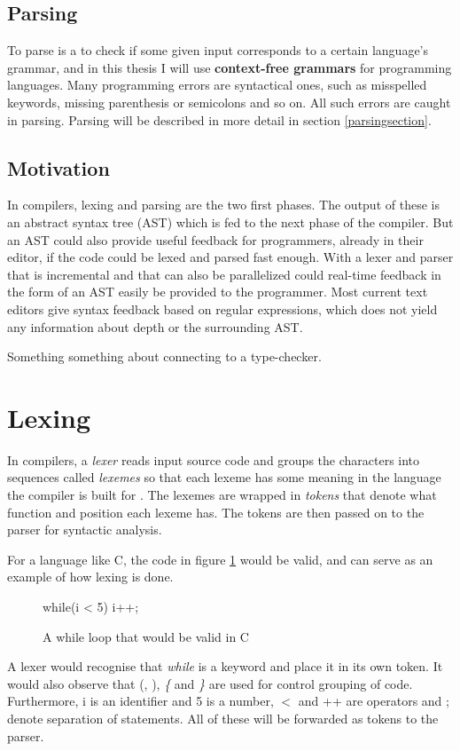 \documentclass[a4paper,12pt,twosided]{report}
\begin{document}
\subsection{Parsing}
To parse is a to check if some given input corresponds to a certain language's
grammar, and in this thesis I will use \textbf{context-free grammars} for
programming languages. Many programming errors are syntactical ones, such as
misspelled keywords, missing parenthesis or semicolons and so on. All such
errors are caught in parsing. Parsing will be described in more detail in
section \ref{parsingsection}.

\subsection{Motivation}
In compilers, lexing and parsing are the two first phases. The output of these
is an abstract syntax tree (AST) which is fed to the next phase of the compiler.
But an AST could also provide useful feedback for programmers, already in their
editor, if the code could be lexed and parsed fast enough. With a lexer and
parser that is incremental and that can also be parallelized could real-time
feedback in the form of an AST easily be provided to the programmer. Most
current text editors give syntax feedback based on regular expressions, which
does not yield any information about depth or the surrounding AST.

Something something about connecting to a type-checker.

\section{Lexing}
In compilers, a \textit{lexer} reads input source code and groups the characters
into sequences called \textit{lexemes} so that each lexeme has some meaning in
the language the compiler is built for \cite[p. 5, p. 109]{dragonbook}. The
lexemes are wrapped in \textit{tokens} that denote what function and position
each lexeme has. The tokens are then passed on to the parser for syntactic
analysis.

For a language like C, the code in figure \ref{lexsample} would be valid, and
can serve as an example of how lexing is done.
\begin{figure}[H]
\begin{code}
while(i < 5) {
    i++;
}
\end{code}
\caption{A while loop that would be valid in C}
\label{lexsample}
\end{figure}
A lexer would recognise that \textit{while} is a keyword and place it in its own
token. It would also observe that (, ), \textit{\{} and \textit{\}} are used for
control grouping of code. Furthermore, i is an identifier and 5 is a number, $<$
and ++ are operators and ; denote separation of statements. All of these will be
forwarded as tokens to the parser.
\end{document}
